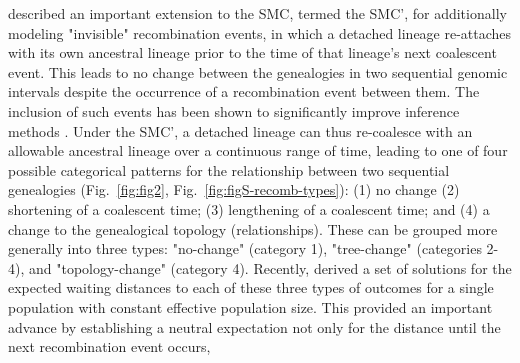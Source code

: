 \documentclass[11pt]{article}
\begin{document}
\cite{marjoram2006fast}
described an important extension to the SMC, termed the SMC', for additionally
modeling "invisible" recombination events, in which a detached lineage re-attaches
with its own ancestral lineage prior to the time of that lineage's next coalescent event. 
This leads to no change between the genealogies in two sequential genomic intervals
despite the occurrence of a recombination event between them. The inclusion of
such events has been shown to 
significantly improve inference methods \citep{wilton2015smc}. 
Under the SMC', a detached lineage can thus re-coalesce with an allowable 
ancestral lineage over a continuous range of time, leading to one of 
four possible categorical patterns for the relationship between two
sequential genealogies
(Fig.~\ref{fig:fig2}, Fig.~\ref{fig:figS-recomb-types}): 
(1) no change %
(2) shortening of a coalescent time; (3) lengthening of a coalescent time; 
and (4) %
a change to the genealogical topology (relationships).
These can be grouped more generally into three types: 
"no-change" (category 1), "tree-change" (categories 2-4), and "topology-change"
(category 4). Recently, \citet{deng_distribution_2021} derived a set of solutions for
the expected waiting distances to each of these three types of 
outcomes for a single population with constant effective population size.
% 
% 
This provided an important advance by establishing a neutral expectation 
not only for the distance until the next recombination event occurs, 
\end{document}
